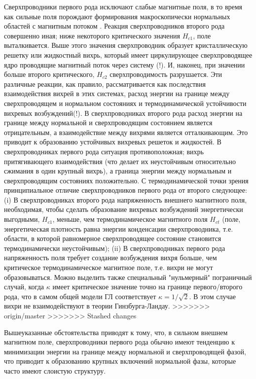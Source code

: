 Сверхпроводники первого рода исключают слабые магнитные поля, в то время как 
сильные поля порождают формирования макроскопически нормальных областей с 
магнитным потоком \cite{bib:4}. Реакция сверхпроводников второго рода 
совершенно иная; ниже некоторого критического значения \( H_{c1} \), поле 
выталкивается. Выше этого значения сверхпроводник образует кристаллическую 
решетку или жидкостный вихрь, который имеет циркулирующее сверхпроводящее 
ядро проводящие магнитный поток через систему (!). И, наконец, при значении 
больше второго критического, \( H_{c2} \) сверхпроводимость разрушается. Эти 
различные реакции, как правило, рассматривается как последствия взаимодействия 
вихрей в этих системах, расход энергии на границе между сверхпроводящем и 
нормальном состояниях и термодинамической устойчивости вихревых возбуждений(!). 
В сверхпроводниках второго рода расход энергии на границе между нормальной и 
сверхпроводящим состоянием является отрицательным, а взаимодействие между 
вихрями является отталкивающим\cite{bib:3}. Это приводит к образованию 
устойчивых вихревых решеток и жидкостей. В сверхпроводниках первого рода 
ситуация противоположная; вихрь притягивающего взаимодействия (что делает их 
неустойчивым относительно сжимания в один крупный вихрь), а граница энергии 
между нормальным и сверхпроводящим состояниях положительно. С термодинамической 
точки зрения принципиальное отличие сверхпроводников первого рода от второго 
следующее: (i) В сверхпроводниках второго рода напряженность внешнего 
магнитного поля, необходимая, чтобы сделать образование вихревых возбуждений 
энергетически выгодными, \( H_{c1} \), меньше, чем термодинамическое 
магнитного поля \( H_{ct} \) (поле, энергетическая плотность равна энергии 
конденсации сверхпроводника, т.е. области, в которой равномерное 
сверхпроводящее состояние становится термодинамически неустойчивым); (ii) В 
сверхпроводниках первого рода напряженность поля требует создание возбуждения 
вихря больше, чем критическое термодинамическое магнитное поле, т.е. вихри не
могут образовываться. Можно выделить также специальный "нульмерный" 
пограничный случай, когда \( \kappa \) имеет критическое значение точно на 
границе первого/второго рода, что в самом общей модели ГЛ соответствует 
\( \kappa = 1/\sqrt{2} \). В этом случае вихри не взаимодействуют\cite{bib:5} 
в теории Гинзбурга-Ландау.
>>>>>>> origin/master
>>>>>>> Stashed changes

Вышеуказанные обстоятельства приводят к тому, что, в сильном внешнем магнитном 
поле, сверхпроводники первого рода обычно имеют тенденцию к минимизации 
энергии на границе между нормальной и сверхпроводящей фазой, что приводит к 
образованию крупных включений нормальной фазы, которые часто имеют слоистую 
структуру\cite{bib:4}. 

